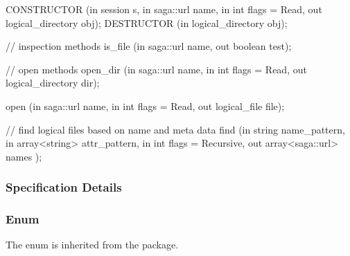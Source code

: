 \begin{myspec}
{{      CONSTRUCTOR     (in  session             s,
                       in  saga::url           name,
                       in  int                 flags = Read,
                       out logical_directory   obj);
      DESTRUCTOR      (in  logical_directory   obj);
 
 
      // inspection methods
      is_file         (in  saga::url           name,
                       out boolean             test);
 
      // open methods
      open_dir        (in  saga::url           name,
                       in  int                 flags = Read,
                       out logical_directory   dir);
 
      open            (in  saga::url           name,
                       in  int                 flags = Read,
                       out logical_file        file);
 
      // find logical files based on name and meta data
      find            (in  string              name_pattern,
                       in  array<string>       attr_pattern,
                       in  int                 flags = Recursive,
                       out array<saga::url>    names   );
    }
  }
 \end{myspec}
 
 
 \subsubsection{Specification Details}
 
  \subsubsection*{Enum }
 
   The  enum is inherited from the 
   package.  
  
 

